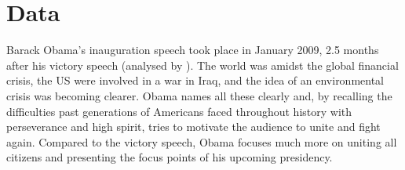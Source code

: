 \documentclass[11pt]{article}
\begin{document}
\section*{Data}{
	Barack Obama's inauguration speech took place in January 2009, 2.5 months after his victory speech (analysed by \citeauthor{Ye}).
	The world was amidst the global financial crisis, the US were involved in a war in Iraq, and the idea of an environmental crisis was becoming clearer.
	Obama names all these clearly and, by recalling the difficulties past generations of Americans faced throughout history with perseverance and high spirit, 
	tries to motivate the audience to unite and fight again.
	Compared to the victory speech, Obama focuses much more on uniting all citizens and presenting the focus points of his upcoming presidency.

}



\end{document}
